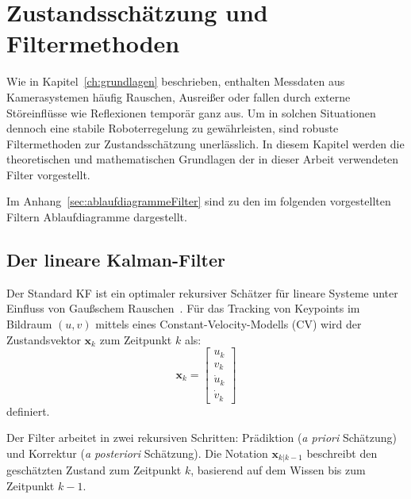 \chapter{Zustandsschätzung und Filtermethoden}
\label{ch:filtermethoden}

Wie in Kapitel~\ref{ch:grundlagen} beschrieben, enthalten Messdaten aus Kamerasystemen häufig Rauschen, Ausreißer oder fallen durch externe Störeinflüsse wie Reflexionen temporär ganz aus. Um in solchen Situationen dennoch eine stabile Roboterregelung zu gewährleisten, sind robuste Filtermethoden zur Zustandsschätzung unerlässlich. In diesem Kapitel werden die theoretischen und mathematischen Grundlagen der in dieser Arbeit verwendeten Filter vorgestellt.

Im Anhang~\ref{sec:ablaufdiagrammeFilter} sind zu den im folgenden vorgestellten Filtern Ablaufdiagramme dargestellt.

\section{Der lineare Kalman-Filter}
\label{sec:LinearerKalmanFilter}
Der Standard \ac{KF} ist ein optimaler rekursiver Schätzer für lineare Systeme unter Einfluss von Gaußschem Rauschen~\cite{kalman1960new, welch2006introduction}. Für das Tracking von Keypoints im Bildraum $(u, v)$ mittels eines Constant-Velocity-Modells (\ac{CV}) wird der Zustandsvektor $\mathbf{x}_k$ zum Zeitpunkt $k$ als:
\begin{equation}
    \mathbf{x}_k = \begin{bmatrix} u_k \\ v_k \\ \dot{u}_k \\ \dot{v}_k \end{bmatrix}
\end{equation}
definiert. %

Der Filter arbeitet in zwei rekursiven Schritten: Prädiktion (\textit{a priori} Schätzung) und Korrektur (\textit{a posteriori} Schätzung). Die Notation $\mathbf{x}_{k|k-1}$ beschreibt den geschätzten Zustand zum Zeitpunkt $k$, basierend auf dem Wissen bis zum Zeitpunkt $k-1$.

